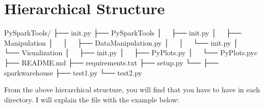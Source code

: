 \documentclass[letterpaper,12pt,english]{sphinxmanual}
\begin{document}
\section{Hierarchical Structure}
\label{\detokenize{pack:hierarchical-structure}}
\begin{sphinxVerbatim}[commandchars=\\\{\}]
PySparkTools/
├── \PYGZus{}\PYGZus{}init\PYGZus{}\PYGZus{}.py
├── PySparkTools
│   ├── \PYGZus{}\PYGZus{}init\PYGZus{}\PYGZus{}.py
│   ├── Manipulation
│   │   ├── DataManipulation.py
│   │   └── \PYGZus{}\PYGZus{}init\PYGZus{}\PYGZus{}.py
│   └── Visualization
│       ├── \PYGZus{}\PYGZus{}init\PYGZus{}\PYGZus{}.py
│       ├── PyPlots.py
│       └── PyPlots.pyc
├── README.md
├── requirements.txt
├── setup.py
└── 
    ├── spark\PYGZhy{}warehouse
    ├── test1.py
    └── test2.py
\end{sphinxVerbatim}

From the above hierarchical structure, you will find that you have to have  in each directory. I will explain the  file with the example below:
\end{document}
